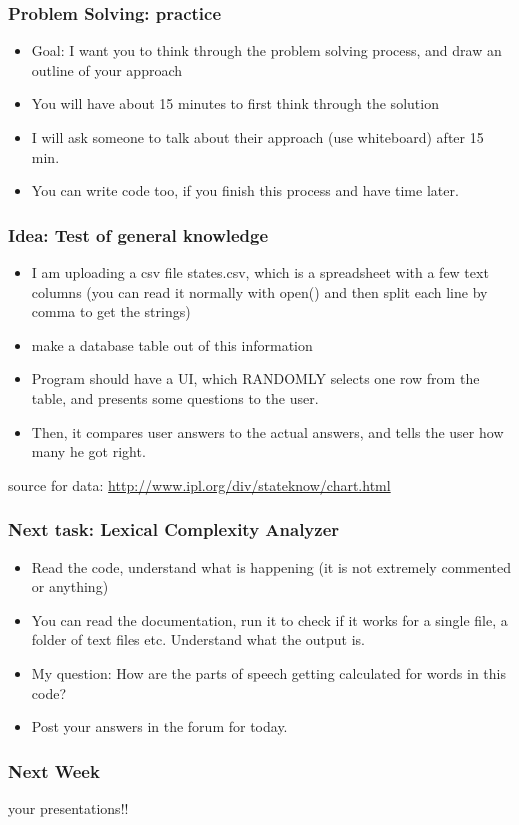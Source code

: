 \documentclass{beamer}
\begin{document}
\begin{frame}
\frametitle{Problem Solving: practice}
\begin{itemize}
\item Goal: I want you to think through the problem solving process, and draw an outline of your approach
\item You will have about 15 minutes to first think through the solution
\item I will ask someone to talk about their approach (use whiteboard) after 15 min.
\item You can write code too, if you finish this process and have time later. 
\end{itemize}
\end{frame}

\begin{frame}
\frametitle{Idea: Test of general knowledge}
\begin{itemize}
\item I am uploading a csv file states.csv, which is a spreadsheet with a few text columns (you can read it normally with open() and then split each line by comma to get the strings)
\item make a database table out of this information
\item Program should have a UI, which RANDOMLY selects one row from the table, and presents some questions to the user.
\item Then, it compares user answers to the actual answers, and tells the user how many he got right.
\end{itemize}
\footnotesize source for data: \url{http://www.ipl.org/div/stateknow/chart.html}
\end{frame}

\begin{frame}
\frametitle{Next task: Lexical Complexity Analyzer}
\begin{itemize}
\item Read the code, understand what is happening (it is not extremely commented or anything)
\item You can read the documentation, run it to check if it works for a single file, a folder of text files etc. Understand what the output is. 
\item My question: How are the parts of speech getting calculated for words in this code?
\item Post your answers in the forum for today.
\end{itemize}
\end{frame}

\begin{frame}
\frametitle{Next Week}
your presentations!! 
\end{frame}
\end{document}
